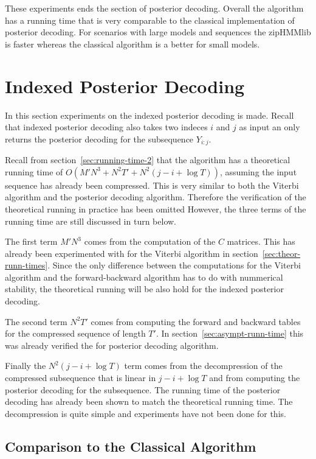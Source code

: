 These experiments ends the section of posterior decoding. Overall the algorithm
has a running time that is very comparable to the classical implementation of
posterior decoding. For scenarios with large models and sequences the zipHMMlib
is faster whereas the classical algorithm is a better for small models.

\section{Indexed Posterior Decoding}

In this section experiments on the indexed posterior decoding is
made. Recall that indexed posterior decoding also takes two indeces $i$ and
$j$ as input an only returns the posterior decoding for the subsequence
$Y_{i:j}$.

Recall from section~\ref{sec:running-time-2} that the algorithm has a
theoretical running time of $O(M' N^3 + N^2 T' + N^2 (j - i + \log T))$,
assuming the input sequence has already been compressed. This is very similar
to both the Viterbi algorithm and the posterior decoding algorithm. Therefore
the verification of the theoretical running in practice has been omitted
However, the three terms of the running time are still discussed in turn below.

The first term $M' N^3$ comes from the computation of the $C$ matrices. This
has already been experimented with for the Viterbi algorithm in
section~\ref{sec:theor-runn-times}. Since the only difference between the
computations for the Viterbi algorithm and the forward-backward algorithm has
to do with nummerical stability, the theoretical running will be also hold for
the indexed posterior decoding.

The second term $N^2 T'$ comes from computing the forward and backward tables
for the compressed sequence of length $T'$. In
section~\ref{sec:asympt-runn-time} this was already verified the for posterior
decoding algorithm.

Finally the $N^2 (j - i + \log T)$ term comes from the decompression of the
compressed subsequence that is linear in $j - i + \log T$ and from computing
the posterior decoding for the subsequence. The running time of the posterior
decoding has already been shown to match the theoretical running time. The
decompression is quite simple and experiments have not been done for
this. 

\subsection{Comparison to the Classical Algorithm}

